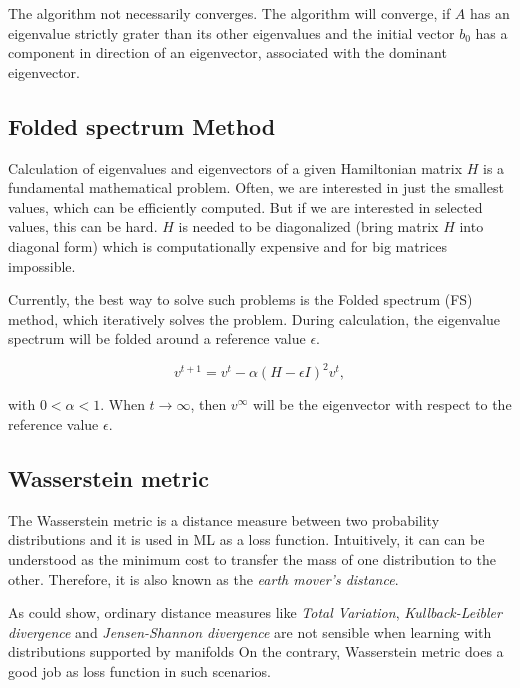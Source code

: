 The algorithm not necessarily converges. The algorithm will converge, if $A$ has an eigenvalue strictly grater than its other eigenvalues
and the initial vector $b_0$ has a component in direction of an eigenvector, associated with the dominant eigenvector.

\subsection{Folded spectrum Method}
\label{sec:FoldedSpectrumMethod}
Calculation of eigenvalues and eigenvectors of a given Hamiltonian matrix $H$ 
is a fundamental mathematical problem. Often, we are interested in just the smallest 
values, which can be efficiently computed. But if we are interested in selected values,
this can be hard. $H$ is needed to be diagonalized (bring matrix $H$ into diagonal form) 
which is computationally expensive and for big matrices impossible.

Currently, the best way to solve such problems is the Folded spectrum (FS)\cite{foldedSpectrumMethod} method,
which iteratively solves the problem. During calculation, the eigenvalue spectrum will be folded around a reference 
value $\epsilon$.

\begin{equation}
    \label{eq:foldedSpectrumMethod}
    v^{t+1} = v^t - \alpha (H - \epsilon I )^2 v^t ,
\end{equation}

with $0 < \alpha < 1$. When $t \rightarrow \infty$, then $v^{\infty}$ will be the 
eigenvector with respect to the reference value $\epsilon$.


\subsection{Wasserstein metric}
\label{sec:wasserstein-metric}
The Wasserstein metric is a distance measure between two probability distributions and it is used in ML as a loss function\cite{learningWithWasserstein}. 
Intuitively, it can can be understood as the minimum cost to transfer the mass of one distribution to the other.
Therefore, it is also known as the \textit{earth mover's distance}.

As \citet{wassersteinGAN} could show, ordinary distance measures like \textit{Total Variation}, \textit{Kullback-Leibler divergence}
and \textit{Jensen-Shannon divergence} are not sensible when learning with distributions supported by manifolds
On the contrary, Wasserstein metric does a good job as loss function in such scenarios.


